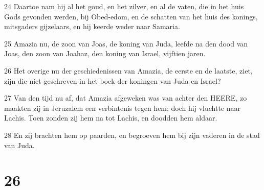 \par 24 Daartoe nam hij al het goud, en het zilver, en al de vaten, die in het huis Gods gevonden werden, bij Obed-edom, en de schatten van het huis des konings, mitsgaders gijzelaars, en hij keerde weder naar Samaria.
\par 25 Amazia nu, de zoon van Joas, de koning van Juda, leefde na den dood van Joas, den zoon van Joahaz, den koning van Israel, vijftien jaren.
\par 26 Het overige nu der geschiedenissen van Amazia, de eerste en de laatste, ziet, zijn die niet geschreven in het boek der koningen van Juda en Israel?
\par 27 Van den tijd nu af, dat Amazia afgeweken was van achter den HEERE, zo maakten zij in Jeruzalem een verbintenis tegen hem; doch hij vluchtte naar Lachis. Toen zonden zij hem na tot Lachis, en doodden hem aldaar.
\par 28 En zij brachten hem op paarden, en begroeven hem bij zijn vaderen in de stad van Juda.

\chapter{26}

